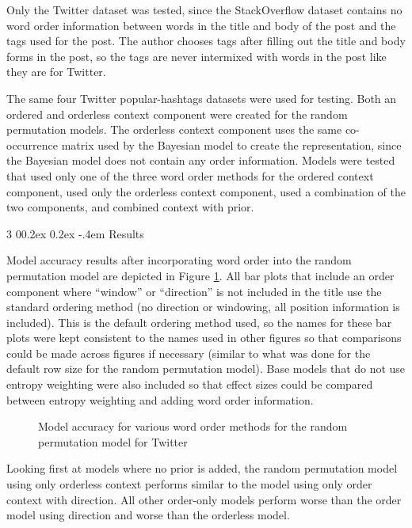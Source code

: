 \documentclass[man,floatsintext,donotrepeattitle]{apa6}
\makeatletter
\renewcommand{\subsubsection}{%
  \@startsection
  {subsubsection}%
  {3}%
  {\parindent}%
  {0\baselineskip \@plus 0.2ex \@minus 0.2ex}%
  {-.4em}%
  {\normalfont\normalsize\bfseries\addperi}}
\makeatother
\begin{document}
Only the Twitter dataset was tested, since the StackOverflow dataset contains no word order information between words in the title and body of the post and the tags used for the post.
The author chooses tags after filling out the title and body forms in the post, so the tags are never intermixed with words in the post like they are for Twitter.

The same four Twitter popular-hashtags datasets were used for testing.
Both an ordered and orderless context component were created for the random permutation models.
The orderless context component uses the same co-occurrence matrix used by the Bayesian model to create the representation, since the Bayesian model does not contain any order information.
Models were tested that used only one of the three word order methods for the ordered context component, used only the orderless context component, used a combination of the two components, and combined context with prior. 

\subsubsection{Results}

Model accuracy results after incorporating word order into the random permutation model are depicted in Figure \ref{figContextOrder}.
All bar plots that include an order component where ``window'' or ``direction'' is not included in the title use the standard ordering method (no direction or windowing, all position information is included).
This is the default ordering method used, so the names for these bar plots were kept consistent to the names used in other figures so that comparisons could be made across figures if necessary
(similar to what was done for the default row size for the random permutation model).
Base models that do not use entropy weighting were also included so that effect sizes could be compared between entropy weighting and adding word order information.

\begin{figure}[!htbp]
  \caption{Model accuracy for various word order methods for the random permutation model for Twitter}
  \label{figContextOrder}
\end{figure}

Looking first at models where no prior is added, the random permutation model using only orderless context performs similar to the model using only order context with direction.
All other order-only models perform worse than the order model using direction and worse than the orderless model.
\end{document}
